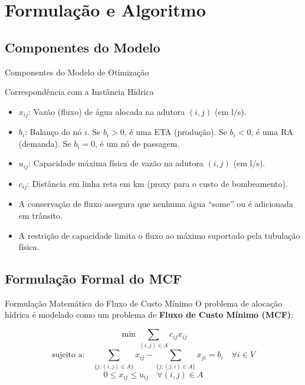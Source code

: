 \section{Formulação e Algoritmo}

\subsection{Componentes do Modelo}
\begin{frame}[shrink=5]{Componentes do Modelo de Otimização}
  \small
  \begin{block}{Correspondência com a Instância Hídrica}
    \begin{itemize}
      \item $x_{ij}$: Vazão (fluxo) de água alocada na adutora $(i,j)$ (em l/s).
      \item $b_i$: Balanço do nó $i$. Se $b_i > 0$, é uma ETA (produção). Se $b_i < 0$, é uma RA (demanda). Se $b_i = 0$, é um nó de passagem.
      \item $u_{ij}$: Capacidade máxima física de vazão na adutora $(i,j)$ (em l/s).
      \item $c_{ij}$: Distância em linha reta em km (proxy para o custo de bombeamento).
    \end{itemize}
  \end{block}
  
  \begin{itemize}
    \item A conservação de fluxo assegura que nenhuma água ``some'' ou é adicionada em trânsito.
    \item A restrição de capacidade limita o fluxo ao máximo suportado pela tubulação física.
  \end{itemize}
\end{frame}

\subsection{Formulação Formal do MCF}
\begin{frame}{Formulação Matemática do Fluxo de Custo Mínimo}
  O problema de alocação hídrica é modelado como um problema de \textbf{Fluxo de Custo Mínimo (MCF)}:
  
  $$\min \sum_{(i,j) \in A} c_{ij} x_{ij}$$
  $$\text{sujeito a:} \quad \sum_{\{j: (i,j) \in A\}} x_{ij} - \sum_{\{j: (j,i) \in A\}} x_{ji} = b_i \quad \forall i \in V$$
  $$0 \leq x_{ij} \leq u_{ij} \quad \forall (i,j) \in A$$
\end{frame}

